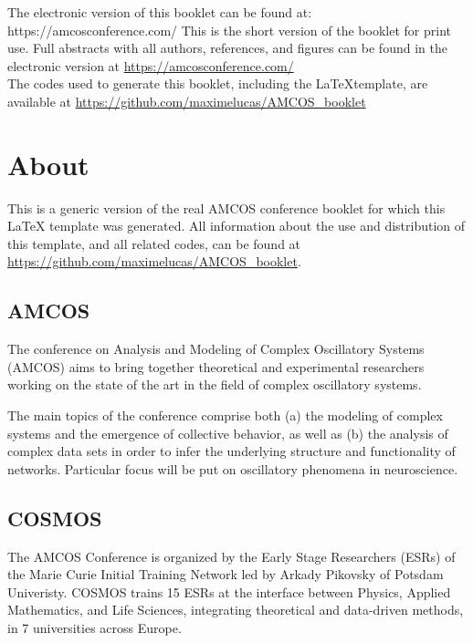 \documentclass[openany, parskip=full, 12pt, a4]{scrbook}
\begin{document}
	
	
\mbox{}
\thispagestyle{empty}
\vfill
\begin{center}
	\ifOnline
	The electronic version of this booklet can be found at: \\
	https://amcosconference.com/
	\else
	This is the short version of the booklet for print use. Full abstracts with all authors, references, and figures can be found in the electronic version at \url{https://amcosconference.com/}
	\fi %
	\\[20pt]
	The codes used to generate this booklet, including the \LaTeX\space template, are available at \url{https://github.com/maximelucas/AMCOS\_booklet}
\end{center}

\newpage

\tableofcontents

\chapter{About}

{\small \textcolor{myblue}{This is a generic version of the real AMCOS conference booklet for which this \LaTeX{} template was generated. All information about the use and distribution of this template, and all related codes, can be found at \url{https://github.com/maximelucas/AMCOS\_booklet}.}}

\section{AMCOS}
The conference on Analysis and Modeling of Complex Oscillatory Systems (AMCOS) aims to bring together theoretical and experimental researchers working on the state of the art in the field of complex oscillatory systems.

The main topics of the conference comprise both (a) the modeling of complex systems and the emergence of collective behavior, as well as (b) the analysis of complex data sets in order to infer the underlying structure and functionality of networks. Particular focus will be put on oscillatory phenomena in neuroscience.

\section{COSMOS}

The AMCOS Conference is organized by the Early Stage Researchers (ESRs) of the Marie Curie Initial Training Network led by Arkady Pikovsky of Potsdam Univeristy. COSMOS trains 15 ESRs at the interface between Physics, Applied Mathematics, and Life Sciences, integrating theoretical and data-driven methods, in 7 universities across Europe.
\end{document}
